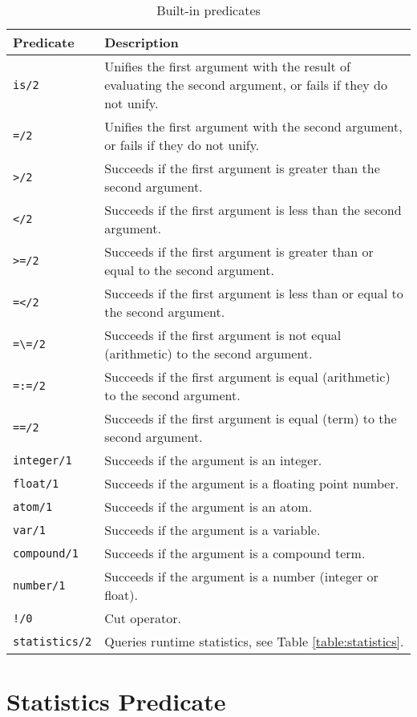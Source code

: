 \begin{appendices}
\begin{table}
\centering
\begin{tabular}{lp{12cm}}
\hline
\textbf{Predicate} & \textbf{Description} \\
\hline
\texttt{is/2} & Unifies the first argument with the result of evaluating the second argument, or fails if they do not unify. \\
\texttt{=/2} & Unifies the first argument with the second argument, or fails if they do not unify. \\
\texttt{>/2} & Succeeds if the first argument is greater than the second argument. \\
\texttt{</2} & Succeeds if the first argument is less than the second argument. \\
\texttt{>=/2} & Succeeds if the first argument is greater than or equal to the second argument. \\
\texttt{=</2} & Succeeds if the first argument is less than or equal to the second argument. \\
\texttt{=\textbackslash=/2} & Succeeds if the first argument is not equal (arithmetic) to the second argument. \\
\texttt{=:=/2} & Succeeds if the first argument is equal (arithmetic) to the second argument. \\
\texttt{==/2} & Succeeds if the first argument is equal (term) to the second argument. \\
\texttt{integer/1} & Succeeds if the argument is an integer. \\
\texttt{float/1} & Succeeds if the argument is a floating point number. \\
\texttt{atom/1} & Succeeds if the argument is an atom. \\
\texttt{var/1} & Succeeds if the argument is a variable. \\
\texttt{compound/1} & Succeeds if the argument is a compound term. \\
\texttt{number/1} & Succeeds if the argument is a number (integer or float). \\
\texttt{!/0} & Cut operator. \\
\texttt{statistics/2} & Queries runtime statistics, see Table \ref{table:statistics}. \\
\hline
\end{tabular}
\caption{Built-in predicates}
\label{table:predicates}
\end{table}

\section{Statistics Predicate}


\end{appendices}
